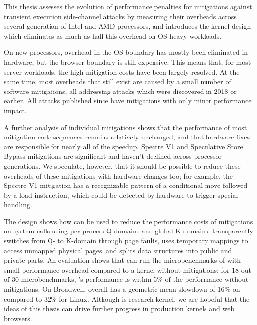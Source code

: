 \label{s:concl}

This thesis assesses the evolution of performance penalties for
mitigations against transient execution side-channel attacks by
measuring their overheads across several generation of Intel and AMD
processors, and introduces the \sys kernel design which eliminates as much
as half this overhead on OS heavy workloads.

On new processors, overhead in the OS boundary has mostly been eliminated in hardware, but the browser boundary is still expensive.
This means that, for most server workloads, the high mitigation costs have been largely resolved.
At the same time, most overheads that still exist are caused by a small number of software mitigations, all addressing attacks which were discovered in 2018 or earlier.
All attacks published since have mitigations with only minor performance impact.

A further analysis of individual mitigations shows that the performance of most mitigation code sequences remains relatively unchanged, and that hardware fixes are responsible for nearly all of the speedup.
Spectre V1 and Speculative Store Bypass mitigations are significant and haven't declined across processor generations.
We speculate, however, that it should be possible to reduce these overheads of these mitigations with hardware changes too;
for example, the Spectre V1 mitigation has a recognizable pattern of a
conditional move followed by a load instruction, which could be
detected by hardware to trigger special handling.

The \sys design
shows how \contract can be used to reduce the performance costs of
mitigations on system calls using per-process Q domains and global K
domains.  \sys transparently switches from Q- to K-domain through page
faults, uses temporary mappings to access unmapped physical pages, and
splits data structures into public and private parts.  An evaluation
shows that \sys can run the microbenchmarks of \bench with small
performance overhead compared to a kernel without mitigations: for
18 out of 30 \bench microbenchmarks, \sys's performance is within 5\%
of the performance without mitigations.
On Broadwell, \sys overall has a geometric mean slowdown of 16\% on \bench compared to 32\% for Linux.
Although \sys is research kernel, we are hopeful that the ideas of this thesis can drive further progress in production kernels and web browsers.
